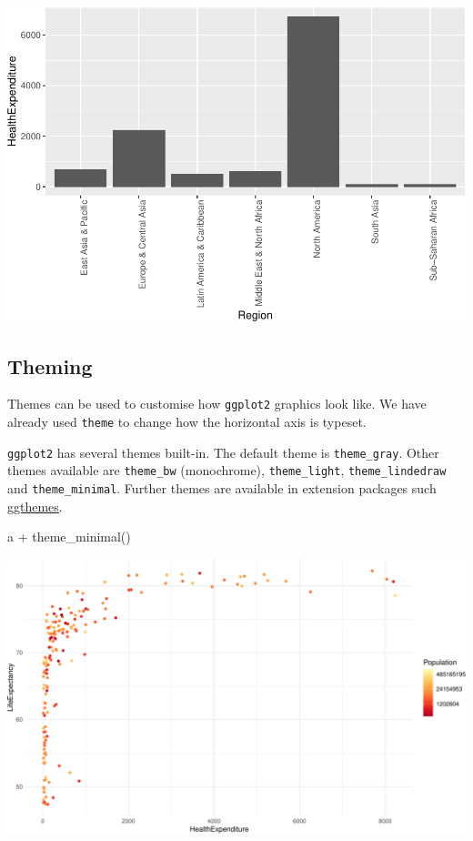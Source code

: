 \documentclass[
]{book}
\newenvironment{Shaded}{\begin{snugshade}}{\end{snugshade}}
\newcommand{\FunctionTok}[1]{\textcolor[rgb]{0.00,0.00,0.00}{#1}}
\newcommand{\NormalTok}[1]{#1}
\newcommand{\SpecialCharTok}[1]{\textcolor[rgb]{0.00,0.00,0.00}{#1}}
\begin{document}
\includegraphics{bookdown-demo_files/figure-latex/unnamed-chunk-63-1.pdf}

\hypertarget{theming}{%
\subsection{Theming}\label{theming}}

Themes can be used to customise how \texttt{ggplot2} graphics look like. We have already used \texttt{theme} to change how the horizontal axis is typeset.

\texttt{ggplot2} has several themes built-in. The default theme is \texttt{theme\_gray}. Other themes available are \texttt{theme\_bw} (monochrome), \texttt{theme\_light}, \texttt{theme\_lindedraw} and \texttt{theme\_minimal}. Further themes are available in extension packages such \href{https://cran.r-project.org/web/packages/ggthemes}{ggthemes}.

\begin{Shaded}
\begin{Highlighting}[]
\NormalTok{a }\SpecialCharTok{+} \FunctionTok{theme\_minimal}\NormalTok{()}
\end{Highlighting}
\end{Shaded}

\includegraphics[width=\textwidth]{bookdown-demo_files/figure-latex/unnamed-chunk-64-1}
\end{document}
